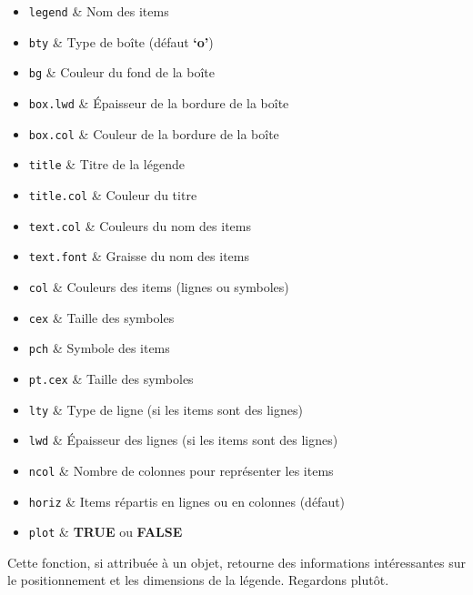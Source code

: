 \documentclass[]{article}
\providecommand{\tightlist}{%
  \setlength{\itemsep}{0pt}\setlength{\parskip}{0pt}}
\begin{document}
\begin{itemize}
\tightlist
\item
  \texttt{legend} \& Nom des items
\item
  \texttt{bty} \& Type de boîte (défaut \textbf{`o'})
\item
  \texttt{bg} \& Couleur du fond de la boîte
\item
  \texttt{box.lwd} \& Épaisseur de la bordure de la boîte
\item
  \texttt{box.col} \& Couleur de la bordure de la boîte
\item
  \texttt{title} \& Titre de la légende
\item
  \texttt{title.col} \& Couleur du titre
\item
  \texttt{text.col} \& Couleurs du nom des items
\item
  \texttt{text.font} \& Graisse du nom des items
\item
  \texttt{col} \& Couleurs des items (lignes ou symboles)
\item
  \texttt{cex} \& Taille des symboles
\item
  \texttt{pch} \& Symbole des items
\item
  \texttt{pt.cex} \& Taille des symboles
\item
  \texttt{lty} \& Type de ligne (si les items sont des lignes)
\item
  \texttt{lwd} \& Épaisseur des lignes (si les items sont des lignes)
\item
  \texttt{ncol} \& Nombre de colonnes pour représenter les items
\item
  \texttt{horiz} \& Items répartis en lignes ou en colonnes (défaut)
\item
  \texttt{plot} \& \textbf{TRUE} ou \textbf{FALSE}
\end{itemize}

Cette fonction, si attribuée à un objet, retourne des informations intéressantes sur le positionnement et les dimensions de la légende. Regardons plutôt.
\end{document}
